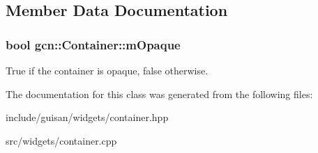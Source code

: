 \subsection{Member Data Documentation}
\subsubsection[{\texorpdfstring{m\+Opaque}{mOpaque}}]{\setlength{\rightskip}{0pt plus 5cm}bool gcn\+::\+Container\+::m\+Opaque\hspace{0.3cm}{\ttfamily [protected]}}\hypertarget{classgcn_1_1Container_a4fd62e01a8196c69c83e751af45a5ade}{}\label{classgcn_1_1Container_a4fd62e01a8196c69c83e751af45a5ade}
True if the container is opaque, false otherwise. 

The documentation for this class was generated from the following files\+:\begin{DoxyCompactItemize}
\item 
include/guisan/widgets/container.\+hpp\item 
src/widgets/container.\+cpp\end{DoxyCompactItemize}
